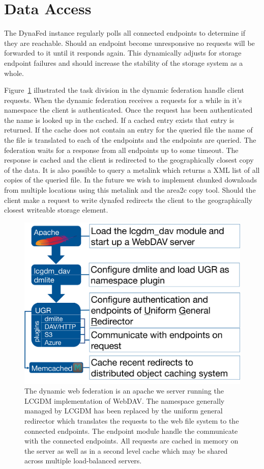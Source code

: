 \documentclass[a4paper]{jpconf}
\begin{document}
\section{Data Access}
The DynaFed instance regularly polls all connected endpoints to determine if they are reachable. Should an endpoint become unresponsive no requests will be forwarded to it until it responds again. This dynamically adjusts for storage endpoint failures and should increase the stability of the storage system as a whole.

Figure~\ref{fig:dynafed-arch} illustrated the task division in the dynamic federation handle client requests. When the dynamic federation receives a requests for a while in it's namespace the client is authenticated. Once the request has been authenticated the name is looked up in the cached. If a cached entry exists that entry is returned. If the cache does not contain an entry for the queried file the name of the file is translated to each of the endpoints and the endpoints are queried. The federation waits for a response from all endpoints up to some timeout. The response is cached and the client is redirected to the geographically closest copy of the data. It is also possible to query a metalink which returns a XML list of all copies of the queried file. In the future we wish to implement chunked downloads from multiple locations using this metalink and the area2c copy tool. Should the client make a request to write dynafed redirects the client to the geographically closest writeable storage element.

\begin{figure}
  \centering
  \includegraphics[width=\textwidth]{dynafed-arch.png}
  \caption{The dynamic web federation is an apache we server running the LCGDM implementation of WebDAV. The namespace generally managed by LCGDM has been replaced by the uniform general redirector which translates the requests to the web file system to the connected endpoints. The endpoint module handle the communicate with the connected endpoints. All requests are cached in memory on the server as well as in a second level cache which may be shared across multiple load-balanced servers.}
  \label{fig:dynafed-arch}
\end{figure}
\end{document}
